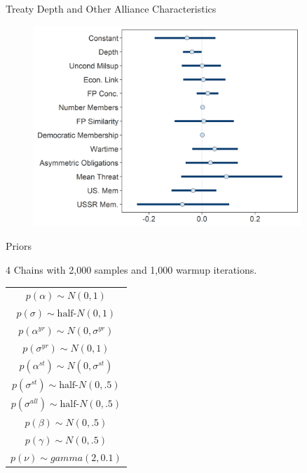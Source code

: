\documentclass[12pt]{beamer}
\begin{document}
\begin{frame}{Treaty Depth and Other Alliance Characteristics}

\begin{figure}
	\centering
		\includegraphics[width=0.9\textwidth]{beta-intervals-min.png}
	\label{fig:beta-intervals-min}
\end{figure}


\end{frame}



\begin{frame}{Priors}

4 Chains with 2,000 samples and 1,000 warmup iterations. 

\begin{table} %

 \begin{center}
\begin{tabular}{c} 
$ p(\alpha) \sim N(0, 1)$  \\
$ p(\sigma) \sim \mbox{half-}N(0, 1) $ \\
$ p(\alpha^{yr}) \sim N(0, \sigma^{yr}) $ \\ 
$ p(\sigma^{yr}) \sim N(0, 1) $ \\
$ p(\alpha^{st}) \sim N(0, \sigma^{st}) $ \\ 
$ p(\sigma^{st}) \sim \mbox{half-}N(0, .5) $ \\ 
$ p(\sigma^{all}) \sim \mbox{half-}N(0, .5) $ \\
$ p(\beta) \sim N(0, .5) $ \\
$ p(\gamma) \sim N(0, .5) $ \\ 
$ p(\nu) \sim gamma(2, 0.1)$ 
\end{tabular} 
\end{center} 
\label{tab:priors}
\end{table} 


\end{frame}
\end{document}
